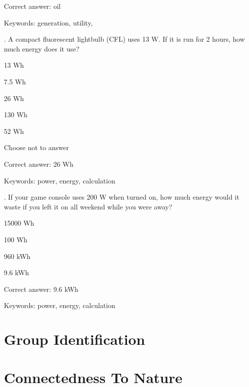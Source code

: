 Correct answer: oil

Keywords: generation, utility, \Hawaii

\vspace{5 mm}
. A compact fluorescent lightbulb (CFL) uses 13 W. If it is run for 2 hours, how much energy does it use?

\begin{answer}
	\item 13 Wh
	\item 7.5 Wh
	\item 26 Wh
	\item 130 Wh
	\item 52 Wh
	\item Choose not to answer
\end{answer}

Correct answer: 26 Wh

Keywords: power, energy, calculation

\vspace{5 mm}
. If your game console uses 200 W when turned on, how much energy would it waste if you left it on all weekend while you were away?

\begin{answer}
	\item 15000 Wh
	\item 100 Wh
	\item 960 kWh
	\item 9.6 kWh
\end{answer}

Correct answer: 9.6 kWh

Keywords: power, energy, calculation


\section{Group Identification}
\label{group-id-items}


\section{Connectedness To Nature}
\label{cns-items}

